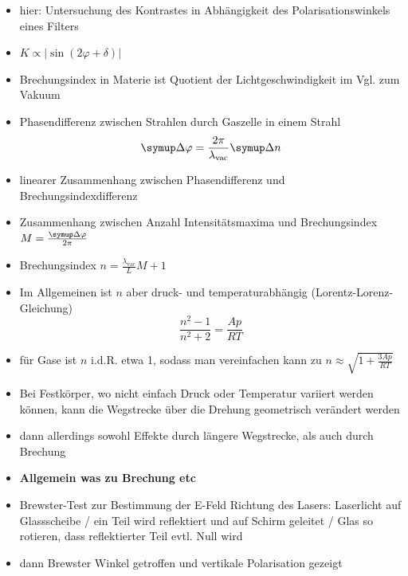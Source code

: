 \begin{itemize}
    \item hier: Untersuchung des Kontrastes in Abhängigkeit des Polarisationswinkels eines Filters
    \item $K\propto |\sin(2\varphi+\delta)|$
    \item Brechungsindex in Materie ist Quotient der Lichtgeschwindigkeit im Vgl. zum Vakuum
    \item Phasendifferenz zwischen Strahlen durch Gaszelle in einem Strahl
        \begin{equation}
            \upD\varphi = \frac{2\pi}{\lambda_\text{vac}}\upD n
        \end{equation}
    \item linearer Zusammenhang zwischen Phasendifferenz und Brechungsindexdifferenz
    \item Zusammenhang zwischen Anzahl Intensitätsmaxima und Brechungsindex $M = \frac{\upD\varphi}{2\pi}$
    \item Brechungsindex $n = \frac{\lambda_\text{vac}}{L}M +1$
    \item Im Allgemeinen ist $n$ aber druck- und temperaturabhängig (Lorentz-Lorenz-Gleichung)
        \begin{equation}
            \frac{n^2-1}{n^2+2} = \frac{Ap}{RT}
        \end{equation}
    \item für Gase ist $n$ i.d.R. etwa 1, sodass man vereinfachen kann zu $n\approx \sqrt{1+\frac{3Ap}{RT}}$
    \item Bei Festkörper, wo nicht einfach Druck oder Temperatur variiert werden können, kann die Wegstrecke über die Drehung geometrisch verändert werden
    \item dann allerdings sowohl Effekte durch längere Wegstrecke, als auch durch Brechung
    \item \textbf{Allgemein was zu Brechung etc}
    \item Brewster-Test zur Bestimmung der E-Feld Richtung des Lasers: Laserlicht auf Glassscheibe / ein Teil wird reflektiert und auf Schirm geleitet / Glas so rotieren, dass reflektierter Teil evtl. Null wird
    \item dann Brewster Winkel getroffen und vertikale Polarisation gezeigt
\end{itemize}

